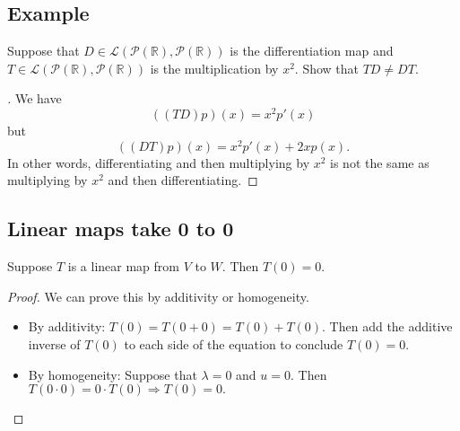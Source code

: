 \documentclass[11pt]{article}
\begin{document}
    \subsection{Example}

    Suppose that \(D \in \mathcal{L}(\mathcal{P}(\mathbb{R}), \mathcal{P}(\mathbb{R}))\) is the differentiation map and \(T \in \mathcal{L}(\mathcal{P}(\mathbb{R}), \mathcal{P}(\mathbb{R}))\) is the multiplication by \(x^2\). Show that \(TD \neq DT\). 

    \begin{proof}[\unskip\nopunct]
        We have \[((TD)p)(x) = x^2 p'(x)\] but \[((DT)p)(x) = x^2 p'(x) + 2x p(x).\] In other words, differentiating and then multiplying by \(x^2\) is not the same as multiplying by \(x^2\) and then differentiating. 
    \end{proof}

    \subsection{Linear maps take 0 to 0}

    Suppose $T$ is a linear map from $V$ to $W$. Then \(T(0) = 0\).

    \begin{proof}
        We can prove this by additivity or homogeneity.
        \begin{itemize}
            \item By additivity: \(T(0) = T(0+0) = T(0) + T(0)\). Then add the additive inverse of \(T(0)\) to each side of the equation to conclude \(T(0) = 0\).
            \item By homogeneity: Suppose that \(\lambda = 0\) and \(u = 0\). Then \(T(0 \cdot 0) = 0 \cdot T(0) \Rightarrow T(0) = 0.\)
        \end{itemize}
    \end{proof}
\end{document}
